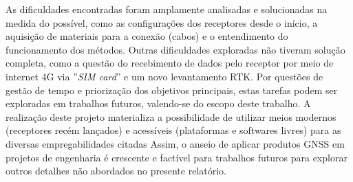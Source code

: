  As dificuldades encontradas foram amplamente analisadas e solucionadas na medida do possível, como as configurações dos receptores desde o início, a aquisição de materiais para a conexão (cabos) e o entendimento do funcionamento dos métodos. Outras dificuldades exploradas não tiveram solução completa, como a questão do recebimento de dados pelo receptor por meio de internet 4G via ''\textit{SIM card}'' e um novo levantamento RTK. Por questões de gestão de tempo e priorização dos objetivos principais, estas tarefas podem ser exploradas em trabalhos futuros, valendo-se do escopo deste trabalho. A realização deste projeto materializa a possibilidade de utilizar meios modernos (receptores recém lançados) e acessíveis (plataformas e softwares livres) para as diversas empregabilidades citadas
Assim, o anseio de aplicar produtos GNSS em projetos de engenharia é crescente e factível para trabalhos futuros para explorar outros detalhes não abordados no presente relatório.